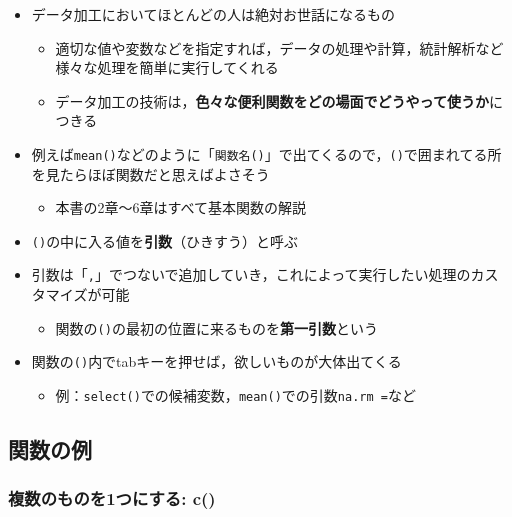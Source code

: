 \documentclass[
  xelatex,ja=standard, b5paper]{bxjsbook}
\providecommand{\tightlist}{%
  \setlength{\itemsep}{0pt}\setlength{\parskip}{0pt}}
\begin{document}
\begin{itemize}
\tightlist
\item
  データ加工においてほとんどの人は絶対お世話になるもの

  \begin{itemize}
  \tightlist
  \item
    適切な値や変数などを指定すれば，データの処理や計算，統計解析など様々な処理を簡単に実行してくれる
  \item
    データ加工の技術は，\textbf{色々な便利関数をどの場面でどうやって使うか}につきる
  \end{itemize}
\item
  例えば\texttt{mean()}などのように「\texttt{関数名()}」で出てくるので，\texttt{()}で囲まれてる所を見たらほぼ関数だと思えばよさそう

  \begin{itemize}
  \tightlist
  \item
    本書の2章～6章はすべて基本関数の解説
  \end{itemize}
\item
  \texttt{()}の中に入る値を\textbf{引数}（ひきすう）と呼ぶ
\item
  引数は「\texttt{,}」でつないで追加していき，これによって実行したい処理のカスタマイズが可能

  \begin{itemize}
  \tightlist
  \item
    関数の\texttt{()}の最初の位置に来るものを\textbf{第一引数}という
  \end{itemize}
\item
  関数の\texttt{()}内でtabキーを押せば，欲しいものが大体出てくる

  \begin{itemize}
  \tightlist
  \item
    例：\texttt{select()}での候補変数，\texttt{mean()}での引数\texttt{na.rm\ =}など
  \end{itemize}
\end{itemize}

\hypertarget{p-function-ex}{%
\subsection{関数の例}\label{p-function-ex}}

\hypertarget{p-function-ex-c}{%
\subsubsection{複数のものを1つにする: c()}\label{p-function-ex-c}}
\end{document}
